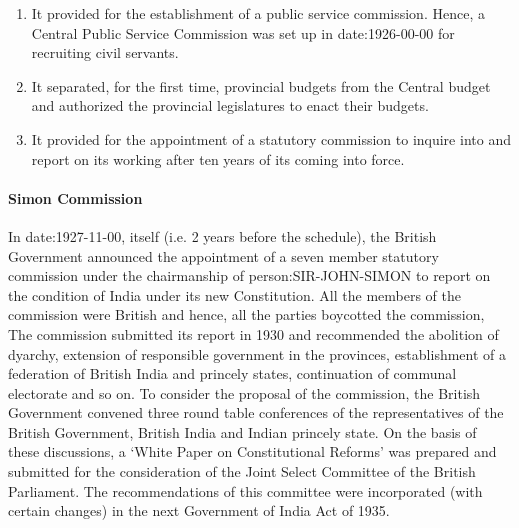 \begin{multicols}{2}
\begin{enumerate}
  \item It provided for the establishment of a public service commission. Hence, a Central Public Service Commission was set up in \gls{date:1926-00-00} for recruiting civil servants.
  \item It separated, for the first time, provincial budgets from the Central budget and authorized the provincial legislatures to enact their budgets.
  \item It provided for the appointment of a statutory commission to inquire into and report on its working after ten years of its coming into force.
\end{enumerate}

\paragraph{Simon Commission}

In \gls{date:1927-11-00}, itself (i.e. 2 years before the schedule), the British Government announced the appointment of a seven member statutory commission under the chairmanship of \gls{person:SIR-JOHN-SIMON} to report on the condition of India under its new Constitution. All the members of the commission were British and hence, all the parties boycotted the commission, The commission submitted its report in 1930 and recommended the abolition of dyarchy, extension of responsible government in the provinces, establishment of a federation of British India and princely states, continuation of communal electorate and so on. To consider the proposal of the commission, the British Government convened three round table conferences of the representatives of the British Government, British India and Indian princely state. On the basis of these discussions, a `White Paper on Constitutional Reforms' was prepared and submitted for the consideration of the Joint Select Committee of the British Parliament. The recommendations of this committee were incorporated (with certain changes) in the next Government of India Act of 1935.


\end{multicols}

